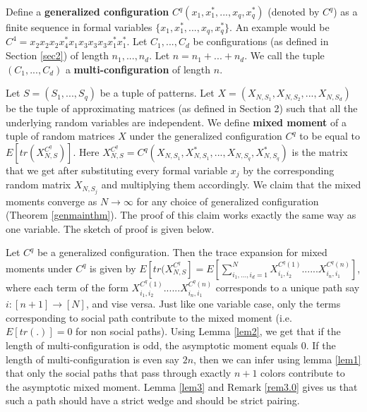 \documentclass[12pt]{amsart}
\theoremstyle{definition}
\theoremstyle{remark}
\begin{document}
 Define a \textbf{generalized configuration} $C^q(x_1,x_1^*,...,x_q,x_q^*)$ (denoted by $C^q$) as a finite sequence in formal variables $\{x_1,x_1^*,...,x_q,x_q^*\}$. An example would be $C^4=x_2x_2x_2x_4^*x_1x_3x_3x_3x_1^*x_1^*$.   Let $C_1,...,C_d$ be configurations (as defined in Section \ref{sec2}) of length $n_1,...,n_d$. Let $n=n_1+...+n_d$. We call the tuple $(C_1,...,C_d)$ a \textbf{multi-configuration} of length $n$.\par
Let $S=(S_1,...,S_q)$ be a tuple of patterns. Let $X=(X_{N,S_1},X_{N,S_2},...,X_{N,S_d})$ be the tuple of approximating matrices (as defined in Section 2) such that all the underlying random variables are independent. We define \textbf{mixed moment} of a tuple of random matrices $X$ under the generalized configuration $C^q$ to be equal to  $E[tr(X_{N,S}^{C^q})]$. Here $X_{N,S}^{C^q}= C^q(X_{N,S_1},X_{N,S_1}^*,...,X_{N,S_q},X_{N,S_q}^*)$ is the matrix that we get after substituting every formal variable $x_j$ by the corresponding random matrix $X_{N,S_j}$ and multiplying them accordingly. We claim that the mixed moments converge as $N \to \infty$ for any choice of generalized configuration (Theorem \ref{genmainthm}). The proof of this claim works exactly the same way as one variable. The sketch of proof is given below.\par


Let $C^q$ be a generalized configuration. Then the trace expansion for mixed moments under $C^q$ is given by $E[tr(X_{N,S}^{C^q}] =  E[\sum_{i_1,...,i_d=1}^N X_{i_1,i_2}^{C^q(1)}......X_{i_{n},i_1}^{C^q(n)}]$, where each term of the form $X_{i_1,i_2}^{C^q(1)}......X_{i_{n},i_1}^{C^q(n)}$ corresponds to a unique path say $i:[n+1] \to [N]$, and vise versa. Just like one variable case, only the terms corresponding to social path contribute to the mixed moment (i.e. $E[tr(.)]=0$ for non social paths). Using Lemma \ref{lem2}, we get that if the length of multi-configuration is odd, the asymptotic moment equals 0. If the length of multi-configuration is even say $2n$, then we can infer using lemma \ref{lem1} that only the social paths that pass through exactly $n+1$ colors contribute to the asymptotic mixed moment. Lemma \ref{lem3} and Remark \ref{rem3.0} gives us that such a path should have a strict wedge and should be strict pairing.  \par
\end{document}
